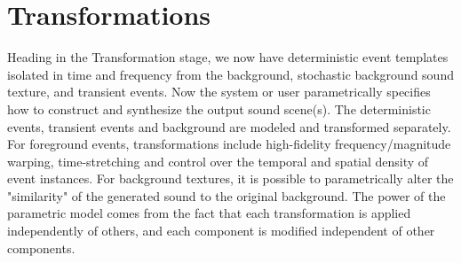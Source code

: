 \documentclass{acmsiggraph}               %
\begin{document}



\section{Transformations}

Heading in the Transformation stage, we now have deterministic event 
templates isolated in time and frequency from the 
background, stochastic background sound texture, and transient events.
Now the system or user parametrically specifies how to 
construct and synthesize the output sound scene(s). The deterministic 
events, transient events and background are modeled and transformed 
separately. For foreground events, transformations include high-fidelity 
frequency/magnitude warping, time-stretching and control over the temporal and spatial 
density of event instances. For background textures, it is possible to parametrically 
alter the "similarity" of the generated sound to the original background. 
The power of the parametric model comes from the 
fact that each transformation is applied independently of others, and each component is 
modified independent of other components. 
\end{document}
